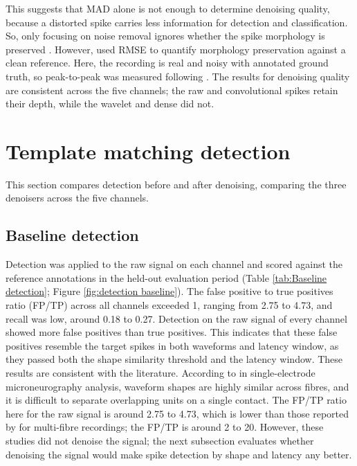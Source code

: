 \documentclass[ %
                    author={Rzan Alkabier},
                    supervisor={Dr. Zahraa Abdallah},
                    degree={MSc},
                     title={Denoising Extracellular Recording for Spike Detection and Classification on Single Channels},
                    subtitle={Does denoising improve detection and classification performance?},
                      type={},
                      year={2026}]{dissertation}
\begin{document}
This suggests that MAD alone is not enough to determine denoising quality, because a distorted spike carries less information for detection and classification. So, only focusing on noise removal ignores whether the spike morphology is preserved \cite{baldazzi_systematic_2020}. However, \cite{baldazzi_systematic_2020} used RMSE to quantify morphology preservation against a clean reference. Here, the recording is real and noisy with annotated ground truth, so peak-to-peak was measured following \cite{adam_comparative_2025}. The results for denoising quality are consistent across the five channels; the raw and convolutional spikes retain their depth, while the wavelet and dense did not. 

\section{Template matching detection}
This section compares detection before and after denoising, comparing the three denoisers across the five channels. 
\subsection{Baseline detection}
 Detection was applied to the raw signal on each channel and scored against the reference annotations in the held-out evaluation period (Table \ref{tab:Baseline detection}; Figure \ref{fig:detection baseline}). The false positive to true positives ratio (FP/TP) across all channels exceeded 1, ranging from 2.75 to 4.73, and recall was low, around 0.18 to 0.27. Detection on the raw signal of every channel showed more false positives than true positives. This indicates that these false positives resemble the target spikes in both waveforms and latency window, as they passed both the shape similarity threshold and the latency window. These results are consistent with the literature. According to \cite{troglio_hybrid_2026, hill_quality_2011} in single-electrode microneurography analysis, waveform shapes are highly similar across fibres, and it is difficult to separate overlapping units on a single contact. The FP/TP ratio here for the raw signal is around 2.75 to 4.73, which is lower than those reported by \cite{troglio_hybrid_2026} for multi-fibre recordings; the FP/TP is around 2 to 20. However, these studies did not denoise the signal; the next subsection evaluates whether denoising the signal would make spike detection by shape and latency any better. 
\end{document}
